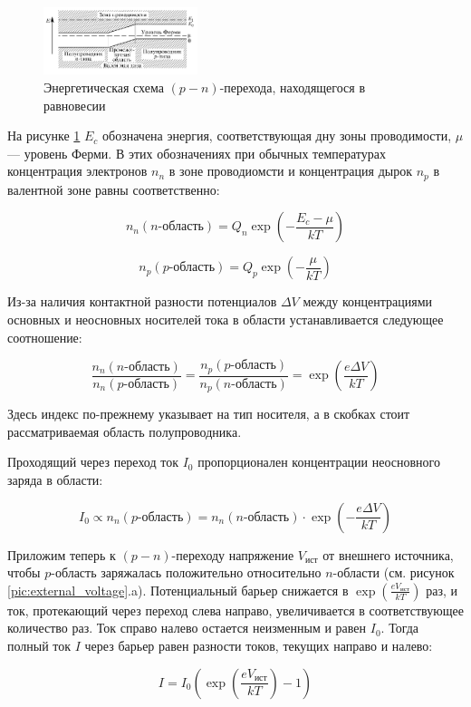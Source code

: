 \documentclass[12pt]{kiarticle} %
\begin{document}
	\begin{figure}[h]
		\centering	
		\includegraphics[width=0.4\textwidth]{energy_scheme.png}
		\caption{Энергетическая схема $(p-n)$-перехода, находящегося в равновесии}
		\label{pic:energy_scheme}
	\end{figure}  
	
	На рисунке \ref{pic:energy_scheme} $E_c$ обозначена энергия, соответствующая дну зоны проводимости, $\mu$ --- уровень Ферми. В этих обозначениях при обычных температурах концентрация электронов $n_n$ в зоне проводиомсти и концентрация дырок $n_p$ в валентной зоне равны соответственно: 
	
	\[ n_n(n\text{-область}) = Q_n\exp\left(-\frac{E_c - \mu}{kT}\right) \]
	
	\[ n_p(p\text{-область}) = Q_p\exp\left(-\frac{\mu}{kT}\right) \]
	
	Из-за наличия контактной разности потенциалов $\Delta V$ между концентрациями основных и неосновных носителей тока в области устанавливается следующее соотношение:
	
	\[ \frac{n_n(n\text{-область})}{n_n(p\text{-область})} = \frac{n_p(p\text{-область})}{n_p(n\text{-область})} = \exp{\left(\frac{e\Delta V}{kT}\right)} \]
	
	Здесь индекс по-прежнему указывает на тип носителя, а в скобках стоит рассматриваемая область полупроводника.
	
	Проходящий через переход ток $I_0$ пропорционален концентрации неосновного заряда в области: 
	
	\[ I_0 \propto n_n(p\text{-область}) = n_n(n\text{-область}) \cdot \exp{\left(-\frac{e\Delta V}{kT}\right)} \]
	
	Приложим теперь к $(p-n)$-переходу напряжение $V_\text{ист}$ от внешнего источника, чтобы $p$-область заряжалась положительно относительно $n$-области (см. рисунок \ref{pic:external_voltage}.a). Потенциальный барьер снижается в $\exp{\left(\frac{eV_\text{ист}}{kT}\right)}$ раз, и ток, протекающий через переход слева направо, увеличивается в соответствующее количество раз. Ток справо налево остается неизменным и равен $I_0$. Тогда полный ток $I$ через барьер равен разности токов, текущих направо и налево: 
	
	\[ I = I_0\left(\exp\left(\frac{eV_\text{ист}}{kT}\right) - 1\right) \]
	
\end{document}
